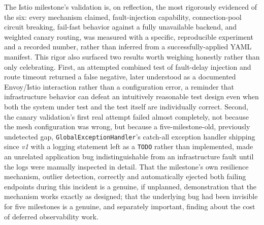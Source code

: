 \documentclass[twoside]{supsistudent}
\begin{document}
The Istio milestone's validation is, on reflection, the most rigorously evidenced of the six: every mechanism claimed, fault-injection capability, connection-pool circuit breaking, fail-fast behavior against a fully unavailable backend, and weighted canary routing, was measured with a specific, reproducible experiment and a recorded number, rather than inferred from a successfully-applied YAML manifest. This rigor also surfaced two results worth weighing honestly rather than only celebrating. First, an attempted combined test of fault-delay injection and route timeout returned a false negative, later understood as a documented Envoy/Istio interaction rather than a configuration error, a reminder that infrastructure behavior can defeat an intuitively reasonable test design even when both the system under test and the test itself are individually correct. Second, the canary validation's first real attempt failed almost completely, not because the mesh configuration was wrong, but because a five-milestone-old, previously undetected gap, \texttt{GlobalExceptionHandler}'s catch-all exception handler shipping since \emph{v1} with a logging statement left as a \texttt{TODO} rather than implemented, made an unrelated application bug indistinguishable from an infrastructure fault until the logs were manually inspected in detail. That the milestone's own resilience mechanism, outlier detection, correctly and automatically ejected both failing endpoints during this incident is a genuine, if unplanned, demonstration that the mechanism works exactly as designed; that the underlying bug had been invisible for five milestones is a genuine, and separately important, finding about the cost of deferred observability work.
\end{document}
